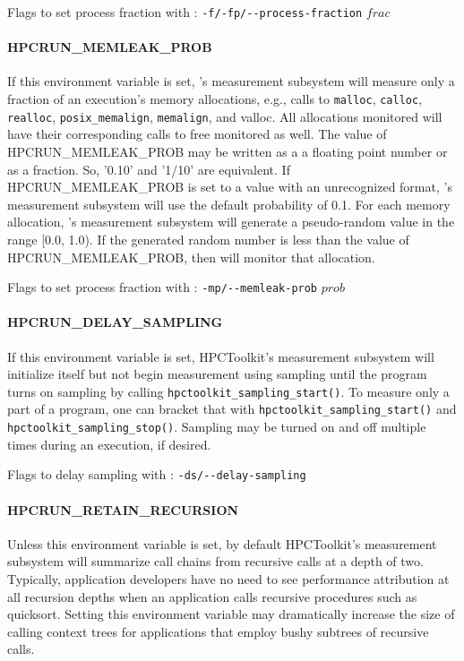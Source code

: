 \parg
Flags to set process fraction with \hpcrun: \verb|-f/-fp/--process-fraction| $frac$

\paragraph{HPCRUN\_MEMLEAK\_PROB}

If this environment variable is set, \HPCToolkit's measurement
subsystem will measure only a fraction of an execution’s memory
allocations, e.g., calls to \verb|malloc|, \verb|calloc|, \verb|realloc|,
\verb|posix_memalign|, \verb|memalign|, and valloc. All allocations
monitored will have their corresponding calls to free monitored as
well. The value of HPCRUN\_MEMLEAK\_PROB may be written as a a
floating point number or as a fraction.  So, '0.10' and '1/10' are
equivalent. If HPCRUN\_MEMLEAK\_PROB is set to a value with an
unrecognized format, \HPCToolkit's measurement subsystem will use the
default probability of 0.1. For each memory allocation, \HPCToolkit's
measurement subsystem will generate a pseudo-random value in the range
[0.0, 1.0). If the generated random number is less than the value
of HPCRUN\_MEMLEAK\_PROB, then \HPCToolkit{} will monitor that
allocation.

\parg
Flags to set process fraction with \hpcrun: \verb|-mp/--memleak-prob| $prob$

\paragraph{HPCRUN\_DELAY\_SAMPLING}

\sloppy
If this environment variable is set, HPCToolkit's measurement subsystem
will initialize itself but not begin measurement using sampling
until the program turns on sampling by calling
\verb|hpctoolkit_sampling_start()|. To measure only a part of a
program, one can bracket that with \verb|hpctoolkit_sampling_start()|
and \verb|hpctoolkit_sampling_stop()|. Sampling may be turned on
and off multiple times during an execution, if desired.

\parg
Flags to delay sampling with \hpcrun: \verb|-ds/--delay-sampling|

\paragraph{HPCRUN\_RETAIN\_RECURSION}

Unless this environment variable is set, by default HPCToolkit's
measurement subsystem will summarize call chains from recursive calls
at a depth of two. Typically, application developers have no need
to see performance attribution at all recursion depths when an
application calls recursive procedures such as quicksort. Setting
this environment variable may dramatically increase the size of
calling context trees for applications that employ bushy subtrees
of recursive calls.

